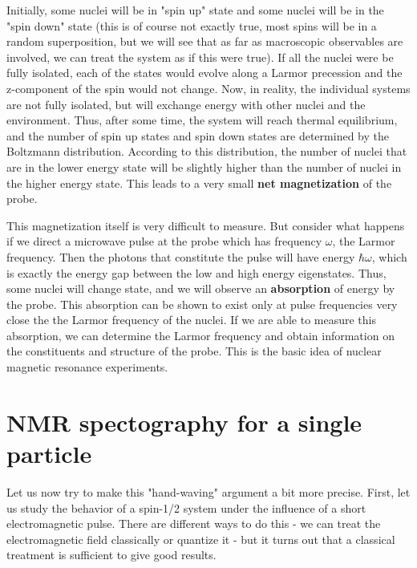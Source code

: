 \documentclass[a4paper, draft]{article}
\theoremstyle{own}
\theoremstyle{remark}
\begin{document}
Initially, some nuclei will be in "spin up" state and some nuclei will be in the "spin down" state (this is of course not exactly true, most spins will be in a random superposition, but we will see that as far as macroscopic observables are involved, we can treat the system as if this were true). If all the nuclei were be fully isolated, each of the states would evolve along a Larmor precession and the z-component of the spin would not change. Now, in reality, the individual systems are not fully isolated, but will exchange energy with other nuclei and the environment. Thus, after some time, the system will reach thermal equilibrium, and the number of spin up states and spin down states are determined by the Boltzmann distribution. According to this distribution, the number of nuclei that are in the lower energy state will be slightly higher than the number of nuclei in the higher energy state. This leads to a very small {\bf net magnetization} of the probe. 

This magnetization itself is very difficult to measure. But consider what happens if we direct a microwave pulse at the probe which has frequency $\omega$, the Larmor frequency. Then the photons that constitute the pulse will have energy $\hbar \omega$, which is exactly the energy gap between the low and high energy eigenstates. Thus, some nuclei will change state, and we will observe an {\bf absorption} of energy by the probe. This absorption can be shown to exist only at pulse frequencies very close the the Larmor frequency of the nuclei. If we are able to measure this absorption, we can determine the Larmor frequency and obtain information on the constituents and structure of the probe. This is the basic idea of nuclear magnetic resonance experiments.


\section{NMR spectography for a single particle}


Let us now try to make this "hand-waving" argument a bit more precise. First, let us study the behavior of a spin-1/2 system under the influence of a short electromagnetic pulse. There are different ways to do this - we can treat the electromagnetic field classically or quantize it - but it turns out that a classical treatment is sufficient to give good results.
\end{document}
